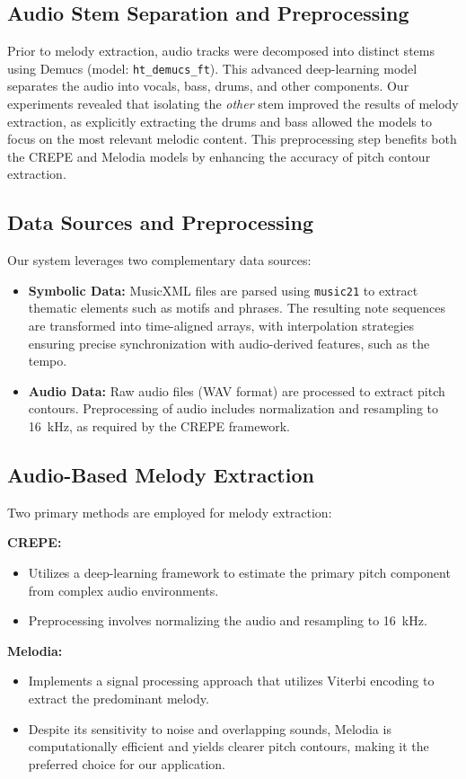 \documentclass[conference]{IEEEtran}
\begin{document}
\subsection{Audio Stem Separation and Preprocessing}
Prior to melody extraction, audio tracks were decomposed into distinct stems using Demucs (model: \texttt{ht\_demucs\_ft}). This advanced deep-learning model separates the audio into vocals, bass, drums, and other components. Our experiments revealed that isolating the \textit{other} stem improved the results of melody extraction, as explicitly extracting the drums and bass allowed the models to focus on the most relevant melodic content. This preprocessing step benefits both the CREPE and Melodia models by enhancing the accuracy of pitch contour extraction.

\subsection{Data Sources and Preprocessing}
Our system leverages two complementary data sources:
\begin{itemize}
    \item \textbf{Symbolic Data:} MusicXML files are parsed using \texttt{music21} to extract thematic elements such as motifs and phrases. The resulting note sequences are transformed into time-aligned arrays, with interpolation strategies ensuring precise synchronization with audio-derived features, such as the tempo.
    \item \textbf{Audio Data:} Raw audio files (WAV format) are processed to extract pitch contours. Preprocessing of audio includes normalization and resampling to 16~kHz, as required by the CREPE framework.
\end{itemize}

\subsection{Audio-Based Melody Extraction}
Two primary methods are employed for melody extraction:

\noindent\textbf{CREPE:}
\begin{itemize}
    \item Utilizes a deep-learning framework to estimate the primary pitch component from complex audio environments.
    \item Preprocessing involves normalizing the audio and resampling to 16~kHz.
\end{itemize}

\noindent\textbf{Melodia:}
\begin{itemize}
    \item Implements a signal processing approach that utilizes Viterbi encoding to extract the predominant melody.
    \item Despite its sensitivity to noise and overlapping sounds, Melodia is computationally efficient and yields clearer pitch contours, making it the preferred choice for our application.
\end{itemize}
\end{document}
